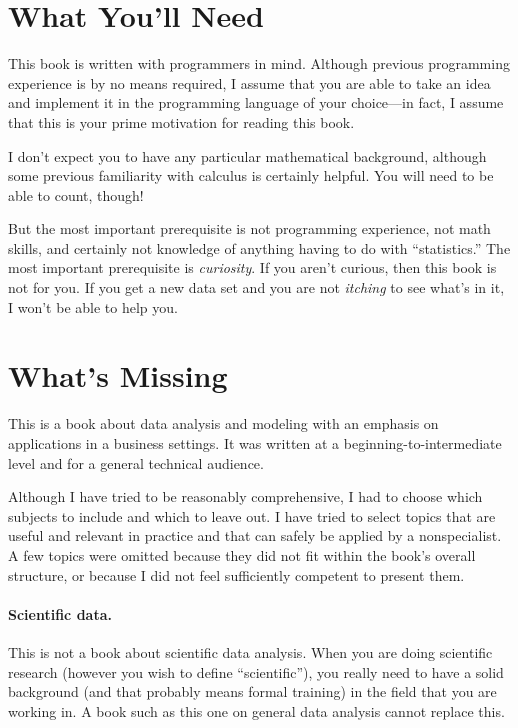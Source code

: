 
\section{What You'll Need}

This book is written with programmers in mind. Although previous
programming experience is by no means required, I assume that you are
able to take an idea and implement it in the programming language of
your choice---in fact, I assume that this is your prime motivation
for reading this book.

I don't expect you to have any particular mathematical background,
although some previous familiarity with calculus is certainly helpful.
You will need to be able to count, though!

But the most important prerequisite is not programming experience, not
math skills, and certainly not knowledge of anything having to do with
``statistics.''  The most important prerequisite is \emph{curiosity}.
If you aren't curious, then this book is not for you.  If you get a
new data set and you are not \emph{itching} to see what's in it, I
won't be able to help you.


\section{What's Missing}

This is a book about data analysis and modeling with an emphasis on
applications in a business settings. It was written at a
beginning-to-intermediate level and for a general technical audience.

Although I have tried to be reasonably comprehensive, I had to choose
which subjects to include and which to leave out. I have tried to
select topics that are useful and relevant in practice and that can
safely be applied by a nonspecialist. A few topics were omitted
because they did not fit within the book's overall structure, or
because I did not feel sufficiently competent to present them.

\paragraph{Scientific data.} This is not a book about scientific data
analysis.  When you are doing scientific research (however you wish
to define ``sc{i}entif{i}c''), you really need to have a solid
background (and that probably means formal training) in the field
that you are working in. A book such as this one on general data
analysis cannot replace this. 

